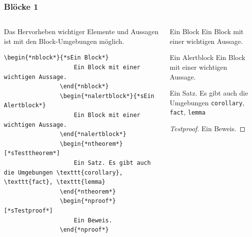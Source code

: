 \documentclass[german,notoc]{tudbeamer}%
\begin{document}
\begin{frame}[fragile]
	\frametitle{Blöcke 1}

	\begin{columns}[T,onlytextwidth]
		\begin{column}[T]{.475\textwidth}
			Das Hervorheben wichtiger Elemente und Aussagen ist mit den Block-Umgebungen möglich.
			\begin{lstlisting}[gobble=8,style=latex]			
				\begin{*nblock*}{*sEin Block*}
					Ein Block mit einer wichtigen Aussage.
				\end{*nblock*}
				\begin{*nalertblock*}{*sEin Alertblock*}
					Ein Block mit einer wichtigen Aussage.
				\end{*nalertblock*}
				\begin{*ntheorem*}[*sTesttheorem*]
					Ein Satz. Es gibt auch die Umgebungen \texttt{corollary}, \texttt{fact}, \texttt{lemma}
				\end{*ntheorem*}
				\begin{*nproof*}[*sTestproof*]
					Ein Beweis.
				\end{*nproof*}
			\end{lstlisting} 
		\end{column}
		\begin{column}[T]{.475\textwidth}
			\begin{block}{Ein Block}
				Ein Block mit einer wichtigen Aussage.
			\end{block}
			\begin{alertblock}{Ein Alertblock}
				Ein Block mit einer wichtigen Aussage.
			\end{alertblock}
			\begin{theorem}[Testtheorem]
				Ein Satz. Es gibt auch die Umgebungen \texttt{corollary}, \texttt{fact}, \texttt{lemma}
			\end{theorem}
			\begin{proof}[Testproof]
				Ein Beweis.
			\end{proof}
		\end{column}
	\end{columns}
\end{frame}
\end{document}
